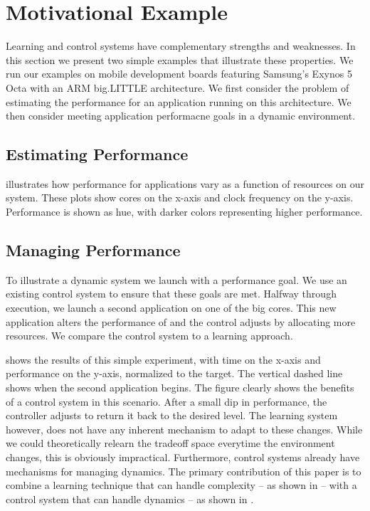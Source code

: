 \section{Motivational Example}
\label{sec:example}

Learning and control systems have complementary strengths and
weaknesses.  In this section we present two simple examples that
illustrate these properties.  We run our examples on mobile
development boards featuring Samsung's Exynos 5 Octa with an ARM
big.LITTLE architecture.  We first consider the problem of estimating
the performance for an application running on this architecture.  We
then consider meeting application performacne goals in a dynamic
environment.  


\subsection{Estimating Performance}
 illustrates how performance for applications vary as
a function of resources on our system.  These plots show cores on the
x-axis and clock frequency on the y-axis.  Performance is shown as
hue, with darker colors representing higher performance.



\subsection{Managing Performance}
To illustrate a dynamic system we launch  with a performance
goal.  We use an existing control system to ensure that these goals
are met.  Halfway through execution, we launch a second application on
one of the big cores.  This new application alters the performance of
 and the control adjusts by allocating more resources.  We
compare the control system to a learning approach.

 shows the results of this simple experiment, with
time on the x-axis and performance on the y-axis, normalized to the
target.  The vertical dashed line shows when the second application
begins.  The figure clearly shows the benefits of a control system in
this scenario.  After a small dip in performance, the controller
adjusts to return it back to the desired level.  The learning system
however, does not have any inherent mechanism to adapt to these
changes.  While we could theoretically relearn the tradeoff space
everytime the environment changes, this is obviously impractical.
Furthermore, control systems already have mechanisms for managing
dynamics.  The primary contribution of this paper is to combine a
learning technique that can handle complexity -- as shown in \figref{}
-- with a control system that can handle dynamics -- as shown in
\figref{}. 

